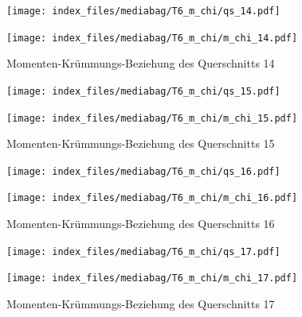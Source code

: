 \documentclass[
  11pt,
  letterpaper,
]{scrreprt}
\begin{document}
\begin{figure}[H]

\begin{minipage}{0.50\linewidth}
\texttt{[image: index\_files/mediabag/T6\_m\_chi/qs\_14.pdf]}\end{minipage}%
%
\begin{minipage}{0.50\linewidth}
\texttt{[image: index\_files/mediabag/T6\_m\_chi/m\_chi\_14.pdf]}\end{minipage}%

\caption{\label{fig-mchi_anhang}Momenten-Krümmungs-Beziehung des
Querschnitts 14}

\end{figure}%

\begin{figure}[H]

\begin{minipage}{0.50\linewidth}
\texttt{[image: index\_files/mediabag/T6\_m\_chi/qs\_15.pdf]}\end{minipage}%
%
\begin{minipage}{0.50\linewidth}
\texttt{[image: index\_files/mediabag/T6\_m\_chi/m\_chi\_15.pdf]}\end{minipage}%

\caption{\label{fig-mchi_anhang}Momenten-Krümmungs-Beziehung des
Querschnitts 15}

\end{figure}%

\begin{figure}[H]

\begin{minipage}{0.50\linewidth}
\texttt{[image: index\_files/mediabag/T6\_m\_chi/qs\_16.pdf]}\end{minipage}%
%
\begin{minipage}{0.50\linewidth}
\texttt{[image: index\_files/mediabag/T6\_m\_chi/m\_chi\_16.pdf]}\end{minipage}%

\caption{\label{fig-mchi_anhang}Momenten-Krümmungs-Beziehung des
Querschnitts 16}

\end{figure}%

\begin{figure}[H]

\begin{minipage}{0.50\linewidth}
\texttt{[image: index\_files/mediabag/T6\_m\_chi/qs\_17.pdf]}\end{minipage}%
%
\begin{minipage}{0.50\linewidth}
\texttt{[image: index\_files/mediabag/T6\_m\_chi/m\_chi\_17.pdf]}\end{minipage}%

\caption{\label{fig-mchi_anhang}Momenten-Krümmungs-Beziehung des
Querschnitts 17}

\end{figure}%
\end{document}
